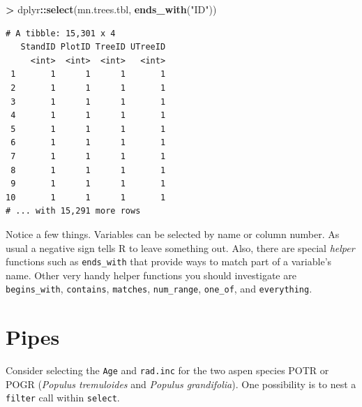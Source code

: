 \documentclass[]{krantz}
\makeatletter
\newenvironment{Shaded}{\begin{snugshade}}{\end{snugshade}}
\newcommand{\KeywordTok}[1]{\textcolor[rgb]{0.27,0.27,0.27}{\textbf{#1}}}
\newcommand{\NormalTok}[1]{#1}
\newcommand{\OperatorTok}[1]{\textcolor[rgb]{0.43,0.43,0.43}{\textbf{#1}}}
\newcommand{\StringTok}[1]{\textcolor[rgb]{0.5,0.5,0.5}{#1}}
\newenvironment{kframe}{%
\medskip{}
\setlength{\fboxsep}{.8em}
 \def\at@end@of@kframe{}%
 \ifinner\ifhmode%
  \def\at@end@of@kframe{\end{minipage}}%
  \begin{minipage}{\columnwidth}%
 \fi\fi%
 \def\FrameCommand##1{\hskip\@totalleftmargin \hskip-\fboxsep
 \colorbox{shadecolor}{##1}\hskip-\fboxsep
     \hskip-\linewidth \hskip-\@totalleftmargin \hskip\columnwidth}%
 \MakeFramed {\advance\hsize-\width
   \@totalleftmargin\z@ \linewidth\hsize
   \@setminipage}}%
 {\par\unskip\endMakeFramed%
 \at@end@of@kframe}
\renewenvironment{Shaded}{\begin{kframe}}{\end{kframe}}
\makeatother
\begin{document}
\begin{Shaded}
\begin{Highlighting}[]
\OperatorTok{>}\StringTok{ }\NormalTok{dplyr}\OperatorTok{::}\KeywordTok{select}\NormalTok{(mn.trees.tbl, }\KeywordTok{ends_with}\NormalTok{(}\StringTok{"ID"}\NormalTok{))}
\end{Highlighting}
\end{Shaded}

\begin{verbatim}
# A tibble: 15,301 x 4
   StandID PlotID TreeID UTreeID
     <int>  <int>  <int>   <int>
 1       1      1      1       1
 2       1      1      1       1
 3       1      1      1       1
 4       1      1      1       1
 5       1      1      1       1
 6       1      1      1       1
 7       1      1      1       1
 8       1      1      1       1
 9       1      1      1       1
10       1      1      1       1
# ... with 15,291 more rows
\end{verbatim}

Notice a few things. Variables can be selected by name or column number. As usual a negative sign tells R to leave something out. Also, there are special \emph{helper} functions such as \texttt{ends\_with} that provide ways to match part of a variable's name. Other very handy helper functions you should investigate are \texttt{begins\_with}, \texttt{contains}, \texttt{matches}, \texttt{num\_range}, \texttt{one\_of}, and \texttt{everything}.

\hypertarget{pipes}{%
\section{Pipes}\label{pipes}}

Consider selecting the \texttt{Age} and \texttt{rad.inc} for the two aspen species POTR or POGR (\emph{Populus tremuloides} and \emph{Populus grandifolia}). One possibility is to nest a \texttt{filter} call within \texttt{select}.

\begin{Shaded}
\end{Shaded}
\end{document}
